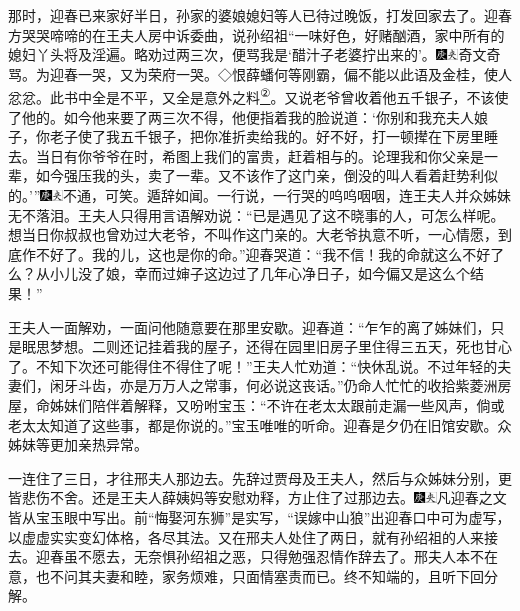 那时，迎春已来家好半日，孙家的婆娘媳妇等人已待过晚饭，打发回家去了。迎春方哭哭啼啼的在王夫人房中诉委曲，说孙绍祖``一味好色，好赌酗酒，家中所有的媳妇丫头将及淫遍。略劝过两三次，便骂我是`醋汁子老婆拧出来的'。{\includegraphics[width=3mm]{../Images/00004}\includegraphics[width=3mm]{../Images/00012}\footnotesize \kaishu 奇文奇骂。为迎春一哭，又为荣府一哭。◇恨薛蟠何等刚霸，偏不能以此语及金桂，使人忿忿。此书中全是不平，又全是意外之料\href{../Text/part0084_split_000.html\#lnkback_2_a}{\textsuperscript{②}}。}又说老爷曾收着他五千银子，不该使了他的。如今他来要了两三次不得，他便指着我的脸说道：`你别和我充夫人娘子，你老子使了我五千银子，把你准折卖给我的。好不好，打一顿撵在下房里睡去。当日有你爷爷在时，希图上我们的富贵，赶着相与的。论理我和你父亲是一辈，如今强压我的头，卖了一辈。又不该作了这门亲，倒没的叫人看着赶势利似的。'''{\includegraphics[width=3mm]{../Images/00004}\includegraphics[width=3mm]{../Images/00012}\footnotesize \kaishu 不通，可笑。遁辞如闻。}一行说，一行哭的呜呜咽咽，连王夫人并众姊妹无不落泪。王夫人只得用言语解劝说：``已是遇见了这不晓事的人，可怎么样呢。想当日你叔叔也曾劝过大老爷，不叫作这门亲的。大老爷执意不听，一心情愿，到底作不好了。我的儿，这也是你的命。''迎春哭道：``我不信！我的命就这么不好了么？从小儿没了娘，幸而过婶子这边过了几年心净日子，如今偏又是这么个结果！''

王夫人一面解劝，一面问他随意要在那里安歇。迎春道：``乍乍的离了姊妹们，只是眠思梦想。二则还记挂着我的屋子，还得在园里旧房子里住得三五天，死也甘心了。不知下次还可能得住不得住了呢！''王夫人忙劝道：``快休乱说。不过年轻的夫妻们，闲牙斗齿，亦是万万人之常事，何必说这丧话。''仍命人忙忙的收拾紫菱洲房屋，命姊妹们陪伴着解释，又吩咐宝玉：``不许在老太太跟前走漏一些风声，倘或老太太知道了这些事，都是你说的。''宝玉唯唯的听命。迎春是夕仍在旧馆安歇。众姊妹等更加亲热异常。

一连住了三日，才往邢夫人那边去。先辞过贾母及王夫人，然后与众姊妹分别，更皆悲伤不舍。还是王夫人薛姨妈等安慰劝释，方止住了过那边去。{\includegraphics[width=3mm]{../Images/00004}\includegraphics[width=3mm]{../Images/00012}\footnotesize \kaishu 凡迎春之文皆从宝玉眼中写出。前``悔娶河东狮''是实写，``误嫁中山狼''出迎春口中可为虚写，以虚虚实实变幻体格，各尽其法。}又在邢夫人处住了两日，就有孙绍祖的人来接去。迎春虽不愿去，无奈惧孙绍祖之恶，只得勉强忍情作辞去了。邢夫人本不在意，也不问其夫妻和睦，家务烦难，只面情塞责而已。终不知端的，且听下回分解。

